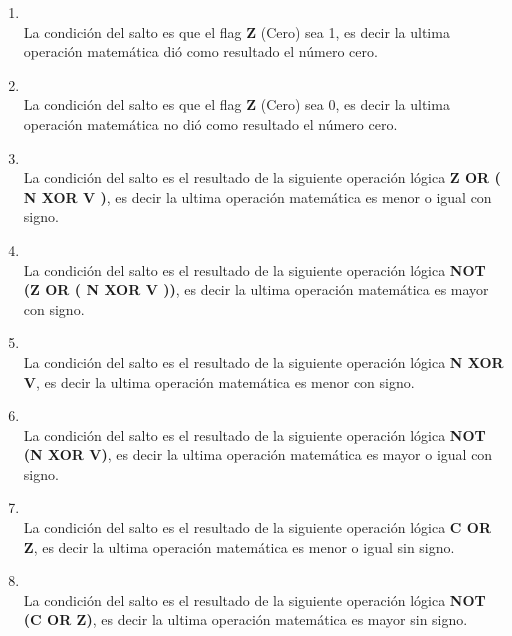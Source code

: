 \begin{enumerate}
\item  {}\\
La condición del salto es que el flag \textbf{Z} (Cero) sea 1, es decir la ultima operación matemática dió como resultado el número cero.

\item  {}\\
La condición del salto es que el flag \textbf{Z} (Cero) sea 0, es decir la ultima operación matemática no dió como resultado el número cero.

\item  {}\\
La condición del salto es el resultado de la siguiente operación lógica \textbf{Z OR ( N XOR V )}, es decir la ultima operación matemática es menor o igual con signo.

\item  {}\\
La condición del salto es el resultado de la siguiente operación lógica \textbf{NOT (Z OR ( N XOR V ))}, es decir la ultima operación matemática es mayor con signo.

\item  {}\\
La condición del salto es el resultado de la siguiente operación lógica \textbf{N XOR V}, es decir la ultima operación matemática es menor con signo.

\item  {}\\
La condición del salto es el resultado de la siguiente operación lógica \textbf{NOT (N XOR V)}, es decir la ultima operación matemática es mayor o igual con signo.

\item  {}\\
La condición del salto es el resultado de la siguiente operación lógica \textbf{C OR Z}, es decir la ultima operación matemática es menor o igual sin signo.

\item  {}\\
La condición del salto es el resultado de la siguiente operación lógica \textbf{NOT (C OR Z)}, es decir la ultima operación matemática es mayor sin signo.


\end{enumerate}
